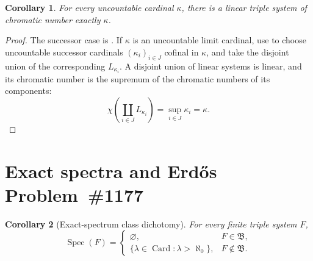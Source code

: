 \documentclass[11pt]{amsart}
\newtheorem{corollary}[corollary]{Corollary}
\theoremstyle{definition}
\theoremstyle{remark}
\numberwithin{equation}{section}
\DeclareMathOperator{\Spec}{Spec}
\DeclareMathOperator{\Card}{Card}
\newcommand{\Bclass}{\mathfrak B}
\begin{document}
\begin{corollary}
\label{cor:all-linear}
For every uncountable cardinal $\kappa$, there is a linear triple system
of chromatic number exactly $\kappa$.
\end{corollary}

\begin{proof}
The successor case is .  If $\kappa$ is an
uncountable limit cardinal, use  to choose
uncountable successor cardinals $(\kappa_i)_{i\in J}$ cofinal in
$\kappa$, and take the disjoint union of the corresponding
$L_{\kappa_i}$.  A disjoint union of linear systems is linear, and its
chromatic number is the supremum of the chromatic numbers of its
components:
\[
 \chi\left(\coprod_{i\in J}L_{\kappa_i}\right)
 =\sup_{i\in J}\kappa_i=\kappa.
\]
\end{proof}


\section{Exact spectra and Erd\H{o}s Problem~\#1177}
\label{sec:spectrum}

\begin{corollary}[Exact-spectrum class dichotomy]
\label{thm:spectrum}
For every finite triple system $F$,
\[
\Spec(F)=
\begin{cases}
\varnothing,&F\in\Bclass,\\[2mm]
\{\lambda\in\Card:\lambda>\aleph_0\},&F\notin\Bclass.
\end{cases}
\]
\end{corollary}
\end{document}
